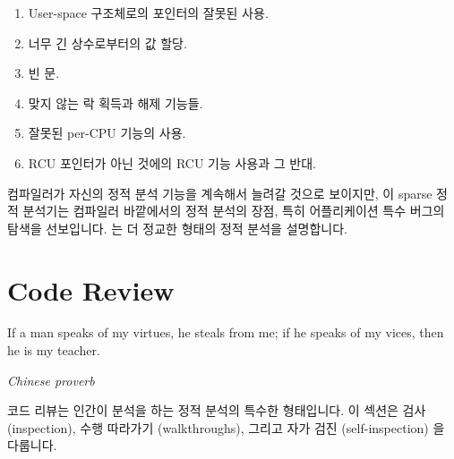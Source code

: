\begin{enumerate}
\item	User-space 구조체로의 포인터의 잘못된 사용.
\item	너무 긴 상수로부터의 값 할당.
\item	빈  문.
\item	맞지 않는 락 획득과 해제 기능들.
\item	잘못된 per-CPU 기능의 사용.
\item	RCU 포인터가 아닌 것에의 RCU 기능 사용과 그 반대.

\end{enumerate}

컴파일러가 자신의 정적 분석 기능을 계속해서 늘려갈 것으로 보이지만, 이 sparse
정적 분석기는 컴파일러 바깥에서의 정적 분석의 장점, 특히 어플리케이션 특수
버그의 탐색을 선보입니다.
는 더 정교한 형태의 정적 분석을 설명합니다.

\section{Code Review}
\label{sec:debugging:Code Review}
%
\epigraph{If a man speaks of my virtues, he steals from me;
	  if he speaks of my vices, then he is my teacher.}
	 {\emph{Chinese proverb}}

코드 리뷰는 인간이 분석을 하는 정적 분석의 특수한 형태입니다.
이 섹션은 검사 (inspection), 수행 따라가기 (walkthroughs), 그리고 자가 검진
(self-inspection) 을 다룹니다.


